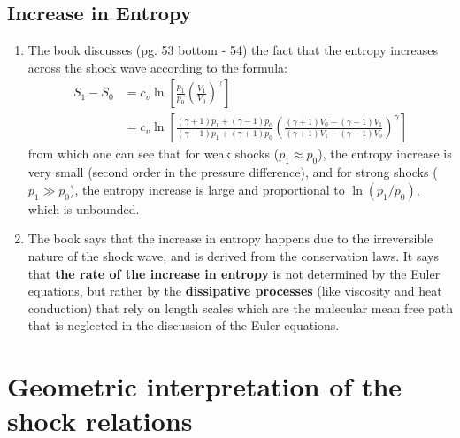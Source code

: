 ﻿\documentclass[11pt]{article}
\begin{document}
\subsection{Increase in Entropy}
\begin{enumerate}
  \item The book discusses (pg. 53 bottom - 54) the fact that the entropy increases across the shock wave according to the formula:
  \begin{equation}
  \begin{aligned}
    S_1 - S_0 &= c_v \ln \left[ \frac{p_1}{p_0} \left( \frac{V_1}{V_0} \right)^{\gamma} \right] \\
    &= c_v \ln \left[ \frac{(\gamma + 1)p_1 + (\gamma - 1)p_0}{(\gamma - 1)p_1 + (\gamma + 1)p_0} \left( \frac{(\gamma + 1)V_0 - (\gamma - 1)V_1}{(\gamma + 1)V_1 - (\gamma - 1)V_0} \right)^{\gamma} \right]
  \end{aligned}
  \end{equation} 
  from which one can see that for weak shocks ($p_1 \approx p_0$), the entropy increase is very small (second order in the pressure difference), and for strong shocks ($p_1 \gg p_0$), the entropy increase is large and proportional to $\ln(p_1/p_0)$, which is unbounded.\
  \item The book says that the increase in entropy happens due to the irreversible nature of the shock wave, and is derived from the conservation laws.
  It says that \textbf{the rate of the increase in entropy} is not determined by the Euler equations, but rather by the \textbf{dissipative processes} (like viscosity and heat conduction) that rely on length scales which are the mulecular mean free path that is neglected in the discussion of the Euler equations.
\end{enumerate}
\section{Geometric interpretation of the shock relations}
\end{document}
